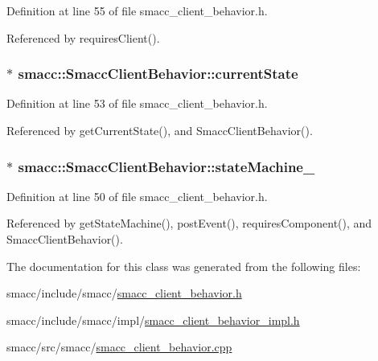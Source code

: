 Definition at line 55 of file smacc\+\_\+client\+\_\+behavior.\+h.



Referenced by requires\+Client().

\subsubsection[{\texorpdfstring{current\+State}{currentState}}]{$\ast$ smacc\+::\+Smacc\+Client\+Behavior\+::current\+State\hspace{0.3cm}{\ttfamily [private]}}\hypertarget{classsmacc_1_1SmaccClientBehavior_af76fc9b877542ed5caf033f820c107d0}{}\label{classsmacc_1_1SmaccClientBehavior_af76fc9b877542ed5caf033f820c107d0}


Definition at line 53 of file smacc\+\_\+client\+\_\+behavior.\+h.



Referenced by get\+Current\+State(), and Smacc\+Client\+Behavior().

\subsubsection[{\texorpdfstring{state\+Machine\+\_\+}{stateMachine_}}]{$\ast$ smacc\+::\+Smacc\+Client\+Behavior\+::state\+Machine\+\_\+\hspace{0.3cm}{\ttfamily [private]}}\hypertarget{classsmacc_1_1SmaccClientBehavior_a7950b5684d6de0a8e8959c0936ce9a19}{}\label{classsmacc_1_1SmaccClientBehavior_a7950b5684d6de0a8e8959c0936ce9a19}


Definition at line 50 of file smacc\+\_\+client\+\_\+behavior.\+h.



Referenced by get\+State\+Machine(), post\+Event(), requires\+Component(), and Smacc\+Client\+Behavior().



The documentation for this class was generated from the following files\+:\begin{DoxyCompactItemize}
\item 
smacc/include/smacc/\hyperlink{smacc__client__behavior_8h}{smacc\+\_\+client\+\_\+behavior.\+h}\item 
smacc/include/smacc/impl/\hyperlink{smacc__client__behavior__impl_8h}{smacc\+\_\+client\+\_\+behavior\+\_\+impl.\+h}\item 
smacc/src/smacc/\hyperlink{smacc__client__behavior_8cpp}{smacc\+\_\+client\+\_\+behavior.\+cpp}\end{DoxyCompactItemize}
